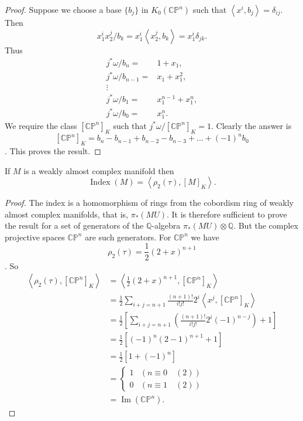 \documentclass[../main]{subfiles}
\begin{document}
\begin{proof}
Suppose we choose a base $\{b_j\}$ in $K_0(\mathbb{CP}^n)$ such that $\left<x^i,b_j\right>=\delta_{ij}.$ Then 
$$x_1^ix_2^j/b_k=x_1^i\left<x_2^j,b_k\right>=x_1^i\delta_{jk}.$$
Thus 
\begin{align}
    j^*\omega/b_n =& 1 + x_1, \nonumber \\
    j^*\omega/b_{n-1} =& x_1 + x_1^2, \nonumber \\
    \vdots& \nonumber\\
    j^*\omega/b_1 =& x_1^{n-1}+x_1^n, \nonumber \\
    j^*\omega/b_0 =& x_1^n. \nonumber
\end{align}
We require the class $[\mathbb{CP}^n]_K$ such that $j^*\omega/[\mathbb{CP}^n]_K=1$. Clearly the answer is
$$[\mathbb{CP}^n]_K=b_n-b_{n-1}+b_{n-2}-b_{n-3}+...+(-1)^n b_0$$.
This proves the result.
\end{proof}
\begin{theorem} \label{thm:p3ch11.16}
If $M$ is a weakly almost complex manifold then
$$\operatorname{Index}(M)=\left<\rho_2(\tau), [M]_K\right>.$$
\end{theorem}
\begin{proof}
The index is a homomorphism of rings from the cobordism ring of weakly almost complex manifolds, that is, $\pi_*(MU)$. It is therefore sufficient to prove the result for a set of generators of the $\mathbb{Q}$-algebra $\pi_*(MU)\otimes \mathbb{Q}$. But the complex projective spaces $\mathbb{CP}^n$ are such generators. For $\mathbb{CP}^n$ we have 
$$\rho_2(\tau)=\frac{1}{2}(2+x)^{n+1}$$.
So 
\begin{align} 
\left<\rho_2(\tau),[\mathbb{CP}^n]_K\right> &= \left<\frac{1}{2}(2+x)^{n+1},[\mathbb{CP}^n]_K\right> \nonumber \\
&= \frac{1}{2}\sum_{i+j=n+1}\frac{(n+1)!}{i!j!}2^i\left<x^j,[\mathbb{CP}^n]_K\right> \nonumber \\
&= \frac{1}{2}\left[\sum_{i+j=n+1}\left(\frac{(n+1)!}{i!j!}2^i(-1)^{n-j}\right) + 1\right] \nonumber \\
&= \frac{1}{2}\left[(-1)^n(2-1)^{n+1}+1\right] \nonumber \\
&= \frac{1}{2}\left[1+(-1)^n\right] \nonumber \\
&= \begin{cases}
  1  & (n\equiv 0 \quad (2)) \\
  0 & (n\equiv 1 \quad (2))
\end{cases} \nonumber \\
&=\operatorname{Im}(\mathbb{CP}^n).
\end{align}
\end{proof}
\end{document}
